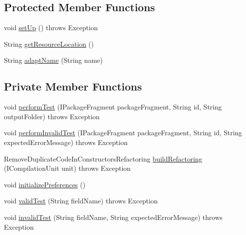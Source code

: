 \subsection*{Protected Member Functions}
\begin{DoxyCompactItemize}
\item 
void \hyperlink{classedu_1_1illinois_1_1canistelCassabanana_1_1tests_1_1RemoveDuplicateCodeInConstructorsRefactoringTests_afb718ed747bbde75a5d5c4e955915def}{setUp} ()  throws Exception 
\item 
String \hyperlink{classedu_1_1illinois_1_1canistelCassabanana_1_1tests_1_1RemoveDuplicateCodeInConstructorsRefactoringTests_ae1e7b0a9eb31811720730a644c2e116a}{getResourceLocation} ()
\item 
String \hyperlink{classedu_1_1illinois_1_1canistelCassabanana_1_1tests_1_1RemoveDuplicateCodeInConstructorsRefactoringTests_aeb1da62dad72af83ae5fee23034c9c40}{adaptName} (String name)
\end{DoxyCompactItemize}
\subsection*{Private Member Functions}
\begin{DoxyCompactItemize}
\item 
void \hyperlink{classedu_1_1illinois_1_1canistelCassabanana_1_1tests_1_1RemoveDuplicateCodeInConstructorsRefactoringTests_ab8c23fd01b2771a4ddc419afee4d95f4}{performTest} (IPackageFragment packageFragment, String id, String outputFolder)  throws Exception 
\item 
void \hyperlink{classedu_1_1illinois_1_1canistelCassabanana_1_1tests_1_1RemoveDuplicateCodeInConstructorsRefactoringTests_afea3b2a67c66712589f7e8155f4620f8}{performInvalidTest} (IPackageFragment packageFragment, String id, String expectedErrorMessage)  throws Exception 
\item 
RemoveDuplicateCodeInConstructorsRefactoring \hyperlink{classedu_1_1illinois_1_1canistelCassabanana_1_1tests_1_1RemoveDuplicateCodeInConstructorsRefactoringTests_a5080560577f9b540a89f7fdcedb23819}{buildRefactoring} (ICompilationUnit unit)  throws Exception 
\item 
void \hyperlink{classedu_1_1illinois_1_1canistelCassabanana_1_1tests_1_1RemoveDuplicateCodeInConstructorsRefactoringTests_ad7c4d4d5ffaf23549e247919159f8676}{initializePreferences} ()
\item 
void \hyperlink{classedu_1_1illinois_1_1canistelCassabanana_1_1tests_1_1RemoveDuplicateCodeInConstructorsRefactoringTests_abecc90ccb6a55d4e52dbf177d29a02ac}{validTest} (String fieldName)  throws Exception 
\item 
void \hyperlink{classedu_1_1illinois_1_1canistelCassabanana_1_1tests_1_1RemoveDuplicateCodeInConstructorsRefactoringTests_a122b249a3eaf49b3f2ce23b7bb93ed39}{invalidTest} (String fieldName, String expectedErrorMessage)  throws Exception 
\end{DoxyCompactItemize}
